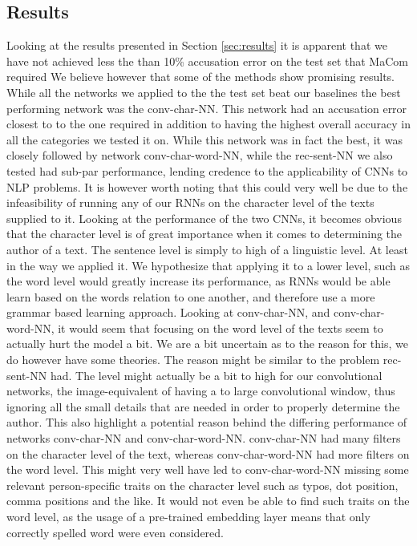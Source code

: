 \subsection{Results}

Looking at the results presented in Section \ref{sec:results} it is apparent
that we have not achieved less the than 10\% accusation error on the test
set that MaCom required We believe however that some of the methods show
promising results. While all the networks we applied to the the test set beat
our baselines the best performing network was the \gls{conv-char-NN}. This
network had an accusation error closest to to the one required in addition to
having the highest overall accuracy in all the categories we tested it on.
While this network was in fact the best, it was closely followed by network
\gls{conv-char-word-NN}, while the \gls{rec-sent-NN} we also tested had sub-par
performance, lending credence to the applicability of \gls{CNN}s to \gls{NLP}
problems. It is however worth noting that this could very well be due to the
infeasibility of running any of our \gls{RNN}s on the character level of the
texts supplied to it. Looking at the performance of the two \gls{CNN}s, it
becomes obvious that the character level is of great importance when it comes
to determining the author of a text. The sentence level is simply to high of
a linguistic level. At least in the way we applied it. We hypothesize that
applying it to a lower level, such as the word level would greatly increase its
performance, as \gls{RNN}s would be able learn based on the words relation to
one another, and therefore use a more grammar based learning approach. Looking
at \gls{conv-char-NN}, and \gls{conv-char-word-NN}, it would seem that focusing
on the word level of the texts seem to actually hurt the model a bit. We are a
bit uncertain as to the reason for this, we do however have some theories. The
reason might be similar to the problem \gls{rec-sent-NN} had. The level might
actually be a bit to high for our convolutional networks, the image-equivalent
of having a to large convolutional window, thus ignoring all the small details
that are needed in order to properly determine the author. This also highlight a
potential reason behind the differing performance of networks \gls{conv-char-NN}
and \gls{conv-char-word-NN}. \gls{conv-char-NN} had many filters on the
character level of the text, whereas \gls{conv-char-word-NN} had more filters on
the word level. This might very well have led to \gls{conv-char-word-NN} missing
some relevant person-specific traits on the character level such as typos, dot
position, comma positions and the like. It would not even be able to find such
traits on the word level, as the usage of a pre-trained embedding layer means
that only correctly spelled word were even considered.

